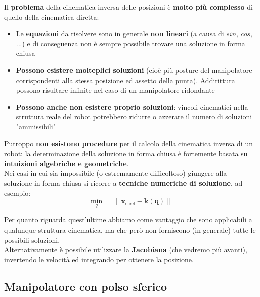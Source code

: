 Il \textbf{problema} della cinematica inversa delle posizioni è \textbf{molto più complesso} di quello della cinematica diretta: 
\begin{itemize}
	\item Le \textbf{equazioni} da risolvere sono in generale \textbf{non lineari} (a causa di $sin$, $cos$, ...) e di conseguenza non è sempre possibile trovare una soluzione in forma chiusa
	\item \textbf{Possono esistere molteplici soluzioni} (cioè più posture del manipolatore corrispondenti alla stessa posizione ed assetto della punta). Addirittura possono risultare infinite nel caso di un manipolatore ridondante
	\item \textbf{Possono anche non esistere proprio soluzioni}: vincoli cinematici nella struttura reale del robot potrebbero ridurre o azzerare il numero di soluzioni "ammissibili"
\end{itemize}

Putroppo \textbf{non esistono procedure} per il calcolo della cinematica inversa di un robot: la determinazione della soluzione in forma chiusa è fortemente basata su \textbf{intuizioni algebriche e geometriche}.\\
Nei casi in cui sia impossibile (o estremamente difficoltoso) giungere alla soluzione in forma chiusa si ricorre a \textbf{tecniche numeriche di soluzione}, ad esempio:
$$
\min_{q} = \| \boldsymbol{x}_{\text{e ref}} - \boldsymbol{k}(\boldsymbol{q}) \|
$$

Per quanto riguarda quest'ultime abbiamo come vantaggio che sono applicabili a qualunque struttura cinematica, ma che però non forniscono (in generale) tutte le possibili soluzioni.\\
Alternativamente è possibile utilizzare la \textbf{Jacobiana} (che vedremo più avanti), invertendo le velocità ed integrando per ottenere la posizione.



\subsection{Manipolatore con polso sferico}


